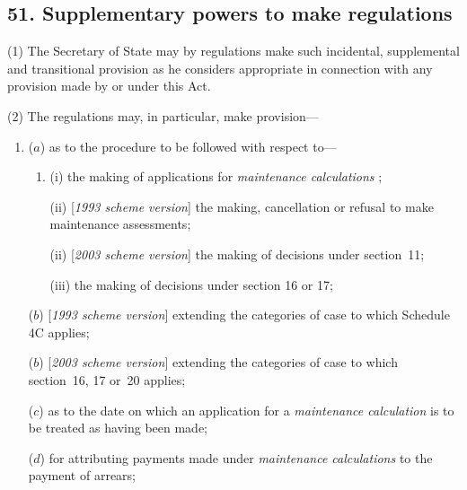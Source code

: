 \documentclass[12pt,a4paper]{article}
\begin{document}

\subsection{51. Supplementary powers to make regulations}

(1) The Secretary of State may by regulations make such incidental, supplemental and transitional provision as he considers appropriate in connection with any provision made by or under this Act.

(2) The regulations may, in particular, make provision—
\begin{enumerate}\item[]
($a$) as to the procedure to be followed with respect to—
\begin{enumerate}\item[]
(i) the making of applications for 
\emph{maintenance calculations}%
;

(ii) [\emph{1993 scheme version}] the making, cancellation or refusal to make maintenance assessments;

(ii) [\emph{2003 scheme version}] the making of decisions under section~11;


(iii) the making of decisions under section 16 or 17;
\end{enumerate}

($b$) [\emph{1993 scheme version}] extending the categories of case to which 
Schedule 4C  %
applies;

($b$) [\emph{2003 scheme version}] extending the categories of case to which section~16, 17 or~20 applies;

($c$) as to the date on which an application for a 
\emph{maintenance calculation}  %
is to be treated as having been made;

($d$) for attributing payments made under 
\emph{maintenance calculations}  %
to the payment of arrears;


\end{enumerate}
\end{document}
